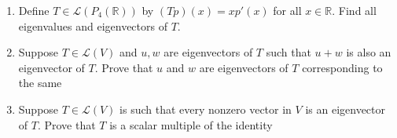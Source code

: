 \documentclass[a4paper,11pt]{article}
\theoremstyle{definition}
\begin{document}
\begin{enumerate}[(1)]
\item 
Define \( T \in \mathcal{L}(P_4(\mathbb{R})) \) by \( (Tp)(x) = x p'(x) \) for all \( x \in \mathbb{R} \). Find all eigenvalues and eigenvectors of \( T \).

\item 
Suppose \( T \in \mathcal{L}(V) \) and \( u, w \) are eigenvectors of \( T \) such that \( u + w \) is also an eigenvector of \( T \). Prove that \( u \) and \( w \) are eigenvectors of \( T \) corresponding to the same 

\item Suppose \( T \in \mathcal{L}(V) \) is such that every nonzero vector in \( V \) is an eigenvector of \( T \). Prove that \( T \) is a scalar multiple of the identity
\end{enumerate}
\end{document}
